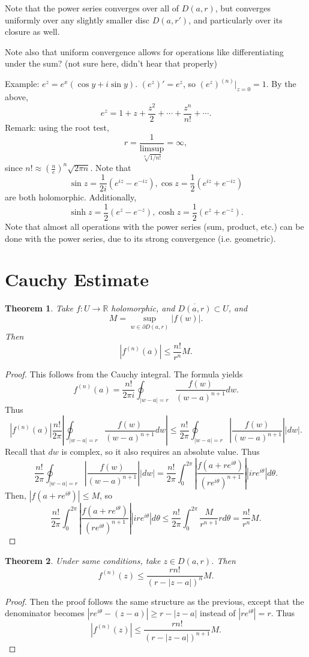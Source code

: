 \documentclass{artikel3}
\newcommand{\pr}[1]{\left(#1\right)}
\newcommand{\abs}[1]{\left|#1\right|}
\newcommand{\complex}{\mathbb{R}}
\newcommand{\del}{\partial}
\newtheorem{thm}{Theorem}
\numberwithin{equation}{enumi}
\begin{document}
Note that the power series converges over all of $D(a,r)$, but converges uniformly
over any slightly smaller disc $D(a,r')$, and particularly over its closure as well.

Note also that uniform convergence allows for operations like differentiating under the sum?
(not sure here, didn't hear that properly)

Example: $e^z=e^x(\cos y+i\sin y)$.  $(e^z)'=e^z$, so $(e^z)^{(n)}|_{z=0}=1$.
By the above, \[
	e^z=1+z+\frac{z^2}{2}+\cdots+\frac{z^n}{n!}+\cdots.
\] Remark: using the root test, \[
	r=\frac{1}{\limsup_{\sqrt[n]{1/n!}}}=\infty,
\] since $n!\approx \pr{\frac{n}{e}}^n\sqrt{2\pi n}$.
Note that \[
	\sin z=\frac{1}{2i}(e^{iz}-e^{-iz}), \cos z=\frac{1}{2}(e^{iz}+e^{-iz})
\] are both holomorphic.  Additionally, \[
	\sinh z=\frac{1}{2}(e^z-e^{-z}), \cosh z=\frac{1}{2}(e^z+e^{-z}).
\] Note that almost all operations with the power series (sum, product, etc.)
can be done with the power series, due to its strong convergence (i.e. geometric).

\section{Cauchy Estimate}
\begin{thm}
	Take $f:U\to\complex$ holomorphic, and $\overline{D(a,r)}\subset U$, and \[
		M=\sup_{w\in\del D(a,r)}\abs{f(w)}.
	\] Then \[
		\abs{f^{(n)}(a)}\leq\frac{n!}{r^n}M.
	\]
\end{thm}
\begin{proof}
	This follows from the Cauchy integral.  The formula yields \[
		f^{(n)}(a)=\frac{n!}{2\pi i}\oint_{\abs{w-a}=r}\frac{f(w)}{(w-a)^{n+1}}dw.
	\] Thus \[
		\abs{f^{(n)}(a)}\frac{n!}{2\pi}\abs{\oint_{\abs{w-a}=r}\frac{f(w)}{(w-a)^{n+1}}dw}
		\leq \frac{n!}{2\pi}\oint_{\abs{w-a}=r}\abs{\frac{f(w)}{(w-a)^{n+1}}}\abs{dw}.
	\] Recall that $dw$ is complex, so it also requires an absolute value.  Thus \[
		\frac{n!}{2\pi}\oint_{\abs{w-a}=r}\abs{\frac{f(w)}{(w-a)^{n+1}}}\abs{dw}
		= \frac{n!}{2\pi}\int_{0}^{2\pi}\abs{\frac{f(a+re^{i\theta})}{(re^{i\theta})^{n+1}}}\abs{ire^{i\theta}}d\theta.
	\] Then, $\abs{f(a+re^{i\theta})}\leq M$, so \[
		\frac{n!}{2\pi}\int_{0}^{2\pi}\abs{\frac{f(a+re^{i\theta})}{(re^{i\theta})^{n+1}}}\abs{ire^{i\theta}}d\theta
		\leq \frac{n!}{2\pi}\int_{0}^{2\pi}\frac{M}{r^{n+1}}rd\theta=\frac{n!}{r^n}M.
	\]
\end{proof}

\begin{thm}
	Under same conditions, take $z\in D(a,r)$.  Then \[
		f^{(n)}(z)\leq \frac{rn!}{(r-\abs{z-a})^n}M.
	\]
\end{thm}
\begin{proof}
	Then the proof follows the same structure as the previous,
	except that the denominator becomes $\abs{re^{i\theta}-(z-a)}\geq r-\abs{z-a}$ instead
	of $\abs{re^{i\theta}}=r$.
	Thus \[
		\abs{f^{(n)}(z)}\leq \frac{rn!}{(r-\abs{z-a})^{n+1}}M.
	\]
\end{proof}
\end{document}
